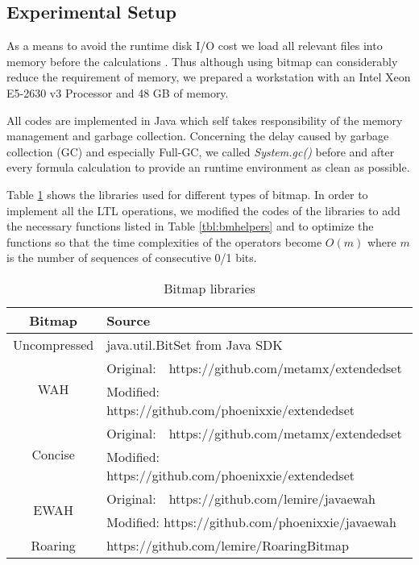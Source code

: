 \subsection{Experimental Setup} %

As a means to avoid the runtime disk I/O cost we load all relevant files into memory before the calculations . Thus although using bitmap can considerably reduce the requirement of memory, we prepared a workstation with an Intel Xeon E5-2630 v3 Processor and 48 GB of memory.

All codes are implemented in Java which self takes responsibility of the memory management and garbage collection. Concerning the delay caused by garbage collection (GC) and especially Full-GC, we called \textit{System.gc()} before and after every formula calculation to provide an runtime environment as clean as possible.

Table \ref{table:bmlibs} shows the libraries used for different types of bitmap. In order to implement all the LTL operations, we modified the codes of the libraries to add the necessary functions listed in Table \ref{tbl:bmhelpers} and to optimize the functions so that the time complexities of the operators become $O(m)$ where $m$ is the number of sequences of consecutive 0/1 bits.

\begin{table}[h]
\centering
\begin{tabular}{|c|l|}
\hline
Bitmap & Source \\
\hline
Uncompressed & java.util.BitSet from Java SDK \\
\hline
\multirow{2}{*}{WAH} & Original:\ \ https://github.com/metamx/extendedset \\
& Modified: https://github.com/phoenixxie/extendedset \\
\hline
\multirow{2}{*}{Concise} & Original:\ \ https://github.com/metamx/extendedset \\
& Modified: https://github.com/phoenixxie/extendedset \\
\hline
\multirow{2}{*}{EWAH} & Original:\ \ https://github.com/lemire/javaewah \\
& Modified: https://github.com/phoenixxie/javaewah \\
\hline
Roaring & https://github.com/lemire/RoaringBitmap \\
\hline
\end{tabular}
\caption{Bitmap libraries}
\label{table:bmlibs}
\end{table}

